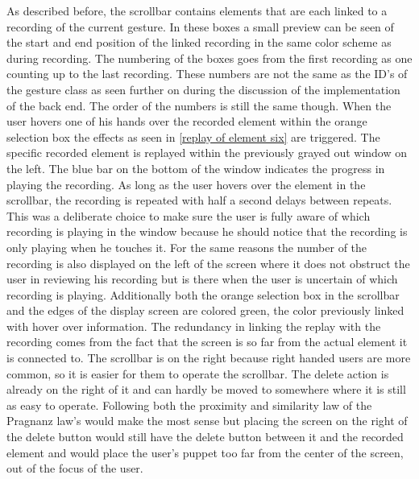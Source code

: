 As described before, the scrollbar contains elements that are each linked to a recording of the current gesture. In these boxes a small preview can be seen of the start and end position of the linked recording in the same color scheme as during recording. The numbering of the boxes goes from the first recording as one counting up to the last recording. These numbers are not the same as the ID's of the gesture class as seen further on during the discussion of the implementation of the back end. The order of the numbers is still the same though. When the user hovers one of his hands over the recorded element within the orange selection box the effects as seen in \ref{replay of element six} are triggered. The specific recorded element is replayed within the previously grayed out window on the left. The blue bar on the bottom of the window indicates the progress in playing the recording. As long as the user hovers over the element in the scrollbar, the recording is repeated with half a second delays between repeats. This was a deliberate choice to make sure the user is fully aware of which recording is playing in the window because he should notice that the recording is only playing when he touches it. For the same reasons the number of the recording is also displayed on the left of the screen where it does not obstruct the user in reviewing his recording but is there when the user is uncertain of which recording is playing. Additionally both the orange selection box in the scrollbar and the edges of the display screen are colored green, the color previously linked with hover over information. The redundancy in linking the replay with the recording comes from the fact that the screen is so far from the actual element it is connected to. The scrollbar is on the right because right handed users are more common, so it is easier for them to operate the scrollbar. The delete action is already on the right of it and can hardly be moved to somewhere where it is still as easy to operate. Following both the proximity and similarity law of the Pragnanz law's would make the most sense but placing the screen on the right of the delete button would still have the delete button between it and the recorded element and would place the user's puppet too far from the center of the screen, out of the focus of the user.\\

